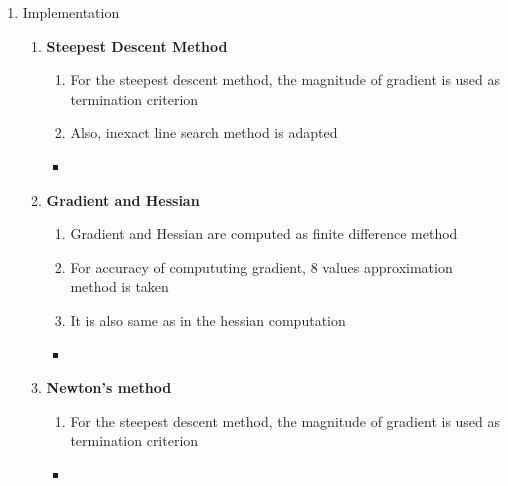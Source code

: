\documentclass[../main.tex]{subfiles}
\begin{document}
\begin{enumerate}
    \item Implementation
      \begin{enumerate}
        \item \textbf{Steepest Descent Method}
        \begin{enumerate}
          \item For the steepest descent method, the magnitude of gradient is used as termination criterion
          \item Also, inexact line search method is adapted
        \end{enumerate}
    
        \begin{itemize}[label=\quad,leftmargin=-5em]
          \item {}
        \end{itemize}
    
        \newpage %
        \item \textbf{Gradient and Hessian}
        \begin{enumerate}
            \item Gradient and Hessian are computed as finite difference method
            \item For accuracy of compututing gradient, 8 values approximation method is taken
            \item It is also same as in the hessian computation 
          \end{enumerate}
      
          \begin{itemize}[label=\quad,leftmargin=-5em]
            \item {}
          \end{itemize}

        \newpage %
        \item \textbf{Newton's method}
        \begin{enumerate}
          \item For the steepest descent method, the magnitude of gradient is used as termination criterion
        \end{enumerate}
        \begin{itemize}[label=\quad,leftmargin=-5em]
          \item {}
        \end{itemize}
    

\end{enumerate}
\end{enumerate}
\end{document}
